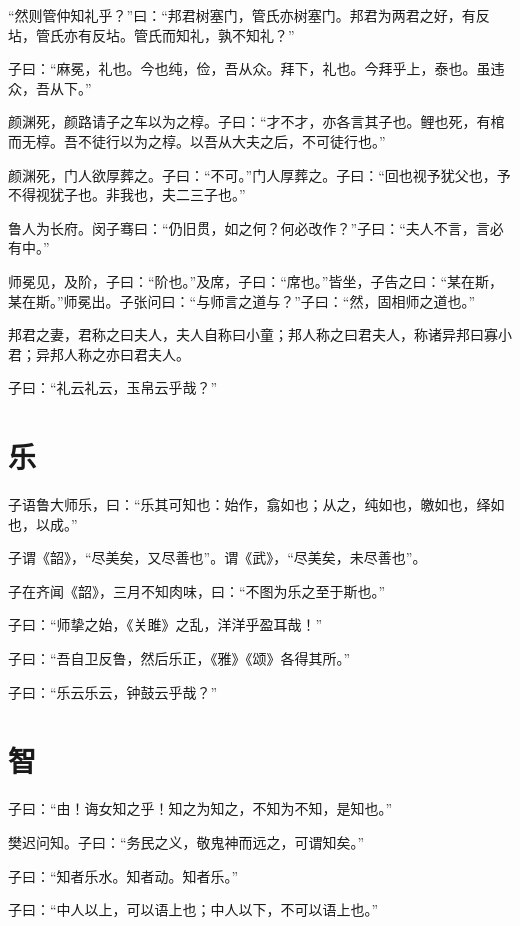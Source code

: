 \documentclass[a5paper]{ctexbook}
\begin{document}
    “然则管仲知礼乎？”曰：“邦君树塞门，管氏亦树塞门。邦君为两君之好，有反坫，管氏亦有反坫。管氏而知礼，孰不知礼？”

    子曰：“麻冕，礼也。今也纯，俭，吾从众。拜下，礼也。今拜乎上，泰也。虽违众，吾从下。”

    颜渊死，颜路请子之车以为之椁。子曰：“才不才，亦各言其子也。鲤也死，有棺而无椁。吾不徒行以为之椁。以吾从大夫之后，不可徒行也。”

    颜渊死，门人欲厚葬之。子曰：“不可。”门人厚葬之。子曰：“回也视予犹父也，予不得视犹子也。非我也，夫二三子也。”

    鲁人为长府。闵子骞曰：“仍旧贯，如之何？何必改作？”子曰：“夫人不言，言必有中。”

    师冕见，及阶，子曰：“阶也。”及席，子曰：“席也。”皆坐，子告之曰：“某在斯，某在斯。”师冕出。子张问曰：“与师言之道与？”子曰：“然，固相师之道也。”

    邦君之妻，君称之曰夫人，夫人自称曰小童；邦人称之曰君夫人，称诸异邦曰寡小君；异邦人称之亦曰君夫人。

    子曰：“礼云礼云，玉帛云乎哉？”
    
    

    \chapter{乐}

    子语鲁大师乐，曰：“乐其可知也：始作，翕如也；从之，纯如也，皦如也，绎如也，以成。”

    子谓《韶》，“尽美矣，又尽善也”。谓《武》，“尽美矣，未尽善也”。

    子在齐闻《韶》，三月不知肉味，曰：“不图为乐之至于斯也。”

    子曰：“师挚之始，《关雎》之乱，洋洋乎盈耳哉！”

    子曰：“吾自卫反鲁，然后乐正，《雅》《颂》各得其所。”

    子曰：“乐云乐云，钟鼓云乎哉？”

    \chapter{智}

    子曰：“由！诲女知之乎！知之为知之，不知为不知，是知也。”

    樊迟问知。子曰：“务民之义，敬鬼神而远之，可谓知矣。”
    
    子曰：“知者乐水。知者动。知者乐。”

    子曰：“中人以上，可以语上也；中人以下，不可以语上也。”
\end{document}
